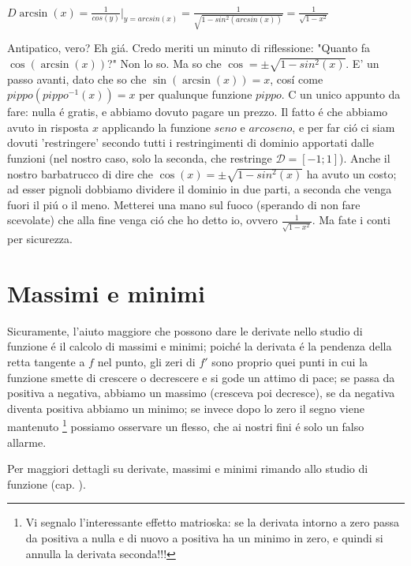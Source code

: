 $D \arcsin(x)= \frac{1}{cos(y)} \bigg|_{y=arcsin(x)}=\frac{1}{\sqrt{1-sin^2(arcsin(x))}}=\frac{1}{\sqrt{1-x^2}}$

Antipatico, vero? Eh gi\'a. Credo meriti un minuto di riflessione: "Quanto fa $\cos(\arcsin(x))$?" Non lo so. Ma so che $\cos = \pm \sqrt{1-sin^2(x)}$. E' un passo avanti, dato che so che $\sin(\arcsin(x))=x$, cos\'i come $pippo(pippo^{-1}(x))=x$ per qualunque funzione $pippo$. C
 un unico appunto da fare: nulla \'e gratis, e abbiamo dovuto pagare un prezzo. Il fatto \'e che abbiamo avuto in risposta $x$ applicando la funzione $seno$ e $arcoseno$, e per far ci\'o ci siam dovuti 'restringere' secondo tutti i restringimenti di dominio apportati dalle funzioni (nel nostro caso, solo la seconda, che restringe $\mathcal{D}=[-1;1]$). Anche il nostro barbatrucco di dire che $\cos(x)=\pm \sqrt{1-sin^2(x)}$ ha avuto un costo; ad esser pignoli dobbiamo dividere il dominio in due parti, a seconda che venga fuori il pi\'u o il meno. Metterei una mano sul fuoco (sperando di non fare scevolate) che alla fine venga ci\'o che ho detto io, ovvero  $\frac{1}{\sqrt{1-x^2}}$. Ma fate i conti per sicurezza.


\section{Massimi e minimi}

Sicuramente, l'aiuto maggiore che possono dare le derivate nello studio di funzione \'e il calcolo di massimi e minimi; poich\'e la derivata \'e la pendenza della retta tangente a $f$ nel punto, gli zeri di $f'$ sono proprio quei punti in cui la funzione smette di crescere o decrescere e si gode un attimo di pace; se passa da positiva a negativa, abbiamo un massimo (cresceva poi decresce), se da negativa diventa positiva abbiamo un minimo; se invece dopo lo zero il segno viene mantenuto \footnote{Vi segnalo l'interessante effetto matrioska: se la derivata intorno a zero passa da positiva a nulla e di nuovo a positiva ha un minimo in zero, e quindi si annulla la derivata seconda!!!} possiamo osservare un flesso, che ai nostri fini \'e solo un falso allarme.

Per maggiori dettagli su derivate, massimi e minimi rimando allo studio di funzione (cap. ).




